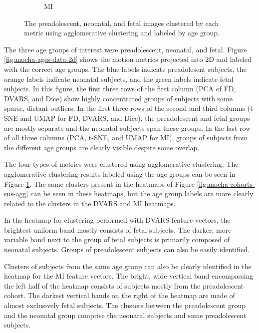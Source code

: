 \begin{figure}[]
\begin{subfigure}{0.49\textwidth}
		\caption{MI}
	\end{subfigure}
\caption{The preadolescent, neonatal, and fetal images clustered by each metric using agglomerative clustering and labeled by age group.}
\label{fig:mocha-ages-sns-agg}
\end{figure}

The three age groups of interest were preadolescent, neonatal, and fetal. Figure \ref{fig:mocha-ages-data-2d} shows the motion metrics projected into 2D and labeled with the correct age groups. The blue labels indicate preadolesent subjects, the orange labels indicate neonatal subjects, and the green labels indicate fetal subjects. In this figure, the first three rows of the first column (PCA of FD, DVARS, and Dice) show highly concentrated groups of subjects with some sparse, distant outliers. In the first three rows of the second and third columns (t-SNE and UMAP for FD, DVARS, and Dice), the preadolescent and fetal groups are mostly separate and the neonatal subjects span these groups. In the last row of all three columns (PCA, t-SNE, and UMAP for MI), groups of subjects from the different age groups are clearly visible despite some overlap. 

The four types of metrics were clustered using agglomerative clustering. The agglomerative clustering results labeled using the age groups can be seen in Figure \ref{fig:mocha-ages-sns-agg}. The same clusters present in the heatmaps of Figure \ref{fig:mocha-cohorts-sns-agg} can be seen in these heatmaps, but the age group labels are more clearly related to the clusters in the DVARS and MI heatmaps.

In the heatmap for clustering performed with DVARS feature vectors, the brightest uniform band mostly consists of fetal subjects. The darker, more variable band next to the group of fetal subjects is primarily composed of neonatal subjects. Groups of preadolescent subjects can also be easily identified. 

Clusters of subjects from the same age group can also be clearly identified in the heatmap for the MI feature vectors. The bright, wide vertical band encompassing the left half of the heatmap consists of subjects mostly from the preadolescent cohort. The darkest vertical bands on the right of the heatmap are made of almost exclusively fetal subjects. The clusters between the preadolescent group and the neonatal group comprise the neonatal subjects and some preadolescent subjects. 

